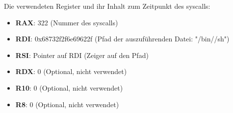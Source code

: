 Die verwendeten Register und ihr Inhalt zum Zeitpunkt des syscalls:

\begin{itemize}
    \item \textbf{RAX}: 322 (Nummer des syscalls)
    \item \textbf{RDI}: 0x68732f2f6e69622f (Pfad der auszuführenden Datei: "/bin//sh")
    \item \textbf{RSI}: Pointer auf RDI (Zeiger auf den Pfad)
    \item \textbf{RDX}: 0 (Optional, nicht verwendet)
    \item \textbf{R10}: 0 (Optional, nicht verwendet)
    \item \textbf{R8}:  0 (Optional, nicht verwendet)
\end{itemize}
